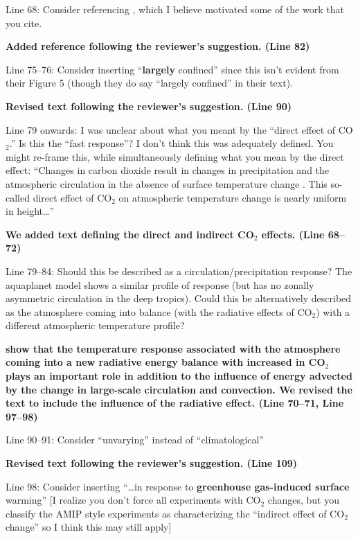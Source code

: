 \documentclass[11pt]{article}
\begin{document}
Line 68: Consider referencing \cite{sobel_enso_2002}, which I believe motivated some of the work that you cite.

\textbf{Added reference following the reviewer's suggestion. (Line 82)}

Line 75--76: Consider inserting ``\textbf{largely} confined'' since this isn't evident from their Figure 5 (though they do say ``largely confined'' in their text).

\textbf{Revised text following the reviewer's suggestion. (Line 90)}

Line 79 onwards: I was unclear about what you meant by the ``direct effect of CO\(_2\).'' Is this the ``fast response''? I don't think this was adequately defined. You might re-frame this, while simultaneously defining what you mean by the direct effect: ``Changes in carbon dioxide result in changes in precipitation and the atmospheric circulation in the absence of surface temperature change \cite{bony_robust_2013}. This so-called direct effect of CO\(_2\) on atmospheric temperature change is nearly uniform in height\ldots{}''

\textbf{We added text defining the direct and indirect CO$_2$ effects. (Line 68--72)}

Line 79--84: Should this be described as a circulation/precipitation response? The aquaplanet model shows a similar profile of response (but has no zonally asymmetric circulation in the deep tropics). Could this be alternatively described as the atmosphere coming into balance (with the radiative effects of CO\(_2\)) with a different atmospheric temperature profile?

\cite{wang_understanding_2020} \textbf{show that the temperature response associated with the atmosphere coming into a new radiative energy balance with increased in CO$_2$ plays an important role in addition to the influence of energy advected by the change in large-scale circulation and convection. We revised the text to include the influence of the radiative effect. (Line 70--71, Line 97--98)}

Line 90--91: Consider ``unvarying'' instead of ``climatological''

\textbf{Revised text following the reviewer's suggestion. (Line 109)}

Line 98: Consider inserting ``\ldots{}in response to \textbf{greenhouse gas-induced surface} warming'' [I realize you don't force all experiments with CO\(_2\) changes, but you classify the AMIP style experiments as characterizing the ``indirect effect of CO\(_2\) change'' so I think this may still apply]
\end{document}

